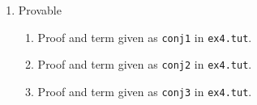 \documentclass{article}
\begin{document}
\begin{enumerate}[label=\textbf{Exercise \arabic*}]
\item Provable
\begin{enumerate}[label=\arabic*.,leftmargin=1em]
\item Proof and term given as \texttt{conj1} in \texttt{ex4.tut}.
\item Proof and term given as \texttt{conj2} in \texttt{ex4.tut}.
\item Proof and term given as \texttt{conj3} in \texttt{ex4.tut}.
\end{enumerate}

\end{enumerate}
\end{document}
